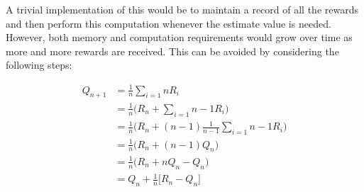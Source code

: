A trivial implementation of this would be to maintain a record of all the rewards and then perform this computation whenever the estimate value is needed. However, both memory and computation requirements would grow over time as more and more rewards are received. This can be avoided by considering the following steps:

\begin{equation*}
    \begin{split}
        Q_{n+1} & = \frac{1}{n} \sum_{i=1}{n} R_i\\
        & = \frac{1}{n} \Big( R_n + \sum_{i=1}{n-1} R_i \Big) \\
        & = \frac{1}{n} \Big( R_n + (n-1) \frac{1}{n-1} \sum_{i=1}{n-1} R_i \Big) \\
        & = \frac{1}{n} \Big( R_n + (n-1) Q_n \Big) \\
        & = \frac{1}{n} \Big( R_n + n Q_n - Q_n \Big) \\
        & = Q_n + \frac{1}{n} \Big[R_n - Q_n \Big]
    \end{split}
\end{equation*}
